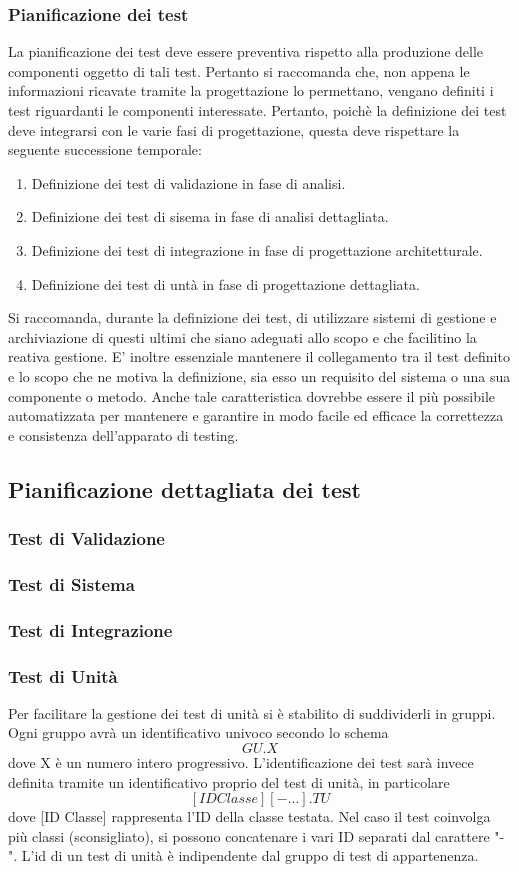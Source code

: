 \documentclass[12pt,a4paper]{article}
\begin{document}
\subsubsection{Pianificazione dei test}
La pianificazione dei test deve essere preventiva rispetto alla produzione delle componenti oggetto di tali test. 
Pertanto si raccomanda che, non appena le informazioni ricavate tramite la progettazione lo permettano, vengano definiti i test riguardanti le componenti interessate.
Pertanto, poichè la definizione dei test deve integrarsi con le varie fasi di progettazione, questa deve rispettare la seguente successione temporale:
\begin{enumerate}
	\item Definizione dei test di validazione in fase di analisi.
	\item Definizione dei test di sisema in fase di analisi dettagliata.
	\item Definizione dei test di integrazione in fase di progettazione architetturale.
	\item Definizione dei test di untà in fase di progettazione dettagliata.
\end{enumerate}
Si raccomanda, durante la definizione dei test, di utilizzare sistemi di gestione e archiviazione di questi ultimi che siano adeguati allo scopo e che facilitino la reativa gestione.
E' inoltre essenziale mantenere il collegamento tra il test definito e lo scopo che ne motiva la definizione, sia esso un requisito del sistema o una sua componente o metodo.
Anche tale caratteristica dovrebbe essere il più possibile automatizzata per mantenere e garantire in modo facile ed efficace la correttezza e consistenza dell'apparato di testing.

\subsection{Pianificazione dettagliata dei test}
\subsubsection{Test di Validazione}
\subsubsection{Test di Sistema}
\subsubsection{Test di Integrazione}
\subsubsection{Test di Unità}
Per facilitare la gestione dei test di unità si è stabilito di suddividerli in gruppi. Ogni gruppo avrà un identificativo univoco secondo lo schema
\[ GU.X  \]
dove X è un numero intero progressivo. 
L'identificazione dei test sarà invece definita tramite un identificativo proprio del test di unità, in particolare
\[ [ID Classe][- ...].TU \] 
dove [ID Classe] rappresenta l'ID della classe testata. Nel caso il test coinvolga più classi (sconsigliato), si possono concatenare i vari ID separati dal carattere "-".
L'id di un test di unità è indipendente dal gruppo di test di appartenenza.
\end{document}
